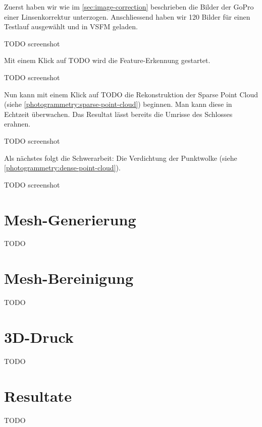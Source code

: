 Zuerst haben wir wie im \autoref{sec:image-correction} beschrieben die Bilder
der GoPro einer Linsenkorrektur unterzogen. Anschliessend haben wir 120 Bilder
für einen Testlauf ausgewählt und in VSFM geladen.

TODO screenshot

Mit einem Klick auf TODO wird die Feature-Erkennung gestartet.

TODO screenshot

Nun kann mit einem Klick auf TODO die Rekonstruktion der Sparse Point Cloud
(siehe \autoref{photogrammetry:sparse-point-cloud}) beginnen. Man kann diese in
Echtzeit überwachen. Das Resultat lässt bereits die Umrisse des Schlosses
erahnen.

TODO screenshot

Als nächstes folgt die Schwerarbeit: Die Verdichtung der Punktwolke (siehe
\autoref{photogrammetry:dense-point-cloud}).

TODO screenshot



\section{Mesh-Generierung}

TODO


\section{Mesh-Bereinigung}

TODO


\section{3D-Druck}

TODO


\section{Resultate}

TODO
